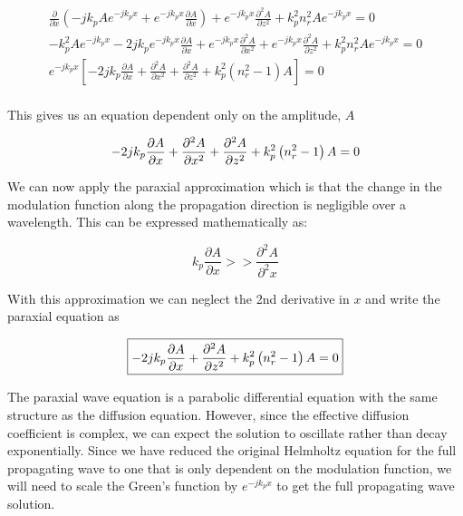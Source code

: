  \begin{equation}
 \begin{gathered}
\frac{\partial }{\partial x}\left(-jk_pAe^{-jk_px}+e^{-jk_px}\frac{\partial A}{\partial x} \right) + e^{-jk_px}\frac{\partial^2 A}{\partial z^2} + k_p^2n_r^2 Ae^{-jk_px} = 0 \\
-k_p^2Ae^{-jk_px} -2jk_pe^{-jk_px}\frac{\partial A}{\partial x}+e^{-jk_px}\frac{\partial^2 A}{\partial x^2} + e^{-jk_px}\frac{\partial^2 A}{\partial z^2} + k_p^2n_r^2 Ae^{-jk_px} = 0 \\
e^{-jk_px}\left[ -2jk_p\frac{\partial A}{\partial x}+\frac{\partial^2 A}{\partial x^2} + \frac{\partial^2 A}{\partial z^2} + k_p^2\left(n_r^2-1\right)A\right] = 0 \\
\end{gathered}
\label{gf_eq:41a}
\end{equation}
\renewcommand{\baselinestretch}{2} \small\normalsize
 
\noindent This gives us an equation dependent only on the amplitude, $A$

 \begin{equation}
-2jk_p\frac{\partial A}{\partial x}+\frac{\partial^2 A}{\partial x^2} + \frac{\partial^2 A}{\partial z^2} + k_p^2\left(n_r^2-1\right)A= 0 \\
\label{gf_eq:42}
\end{equation}
 \renewcommand{\baselinestretch}{2} \small\normalsize
 
We can now apply the paraxial approximation which is that the change in the modulation function along the propagation direction is negligible over a wavelength. This can be expressed mathematically as:
 
  \begin{equation}
k_p\frac{\partial A}{\partial x} >> \frac{\partial^2 A}{\partial^2 x}
\label{gf_eq:43}
\end{equation}
 \renewcommand{\baselinestretch}{2} \small\normalsize
 
With this approximation we can neglect the 2nd derivative in $x$ and write the paraxial equation as
 
\begin{equation}
\boxed{-2jk_p\frac{\partial A}{\partial x} + \frac{\partial^2 A}{\partial z^2} +k_p^2\left(n_r^2-1\right)A= 0} \\
\label{gf_eq:44}
\end{equation}
\renewcommand{\baselinestretch}{2} \small\normalsize
 
The paraxial wave equation is a parabolic differential equation with the same structure as the diffusion equation. However, since the effective diffusion coefficient is complex, we can expect the solution to oscillate rather than decay exponentially. Since we have reduced the original Helmholtz equation for the full propagating wave to one that is only dependent on the modulation function, we will need to scale the Green's function by $e^{-jk_px}$ to get the full propagating wave solution.
 
